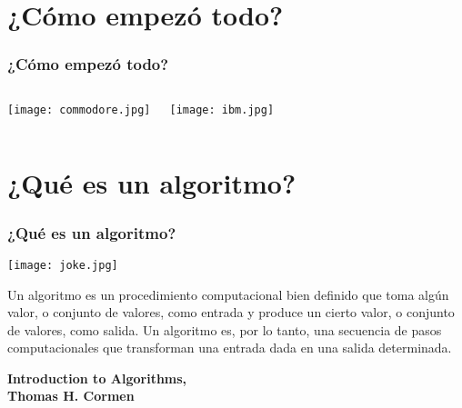 \documentclass[aspectratio=169]{beamer}
\begin{document}
\section{¿Cómo empezó todo?} %

\begin{frame}
\frametitle{¿Cómo empezó todo?}
\begin{columns}[c] %
	
		\texttt{[image: commodore.jpg]}
	
		\texttt{[image: ibm.jpg]}
	
\end{columns}
\end{frame}

\section{¿Qué es un algoritmo?} %

\begin{frame}
\frametitle{¿Qué es un algoritmo?}
	\centering
	\texttt{[image: joke.jpg]}	
\end{frame}

\begin{frame}
	Un algoritmo es un procedimiento computacional bien definido que toma algún valor, o conjunto de valores, como entrada y produce un cierto valor, o conjunto de valores, como salida. Un algoritmo es, por lo tanto, una secuencia de pasos computacionales que transforman una entrada dada en una salida determinada.
	\begin{flushright}
		\textbf{Introduction to Algorithms, \\ Thomas H. Cormen}
	\end{flushright}
\end{frame}

\end{document}
